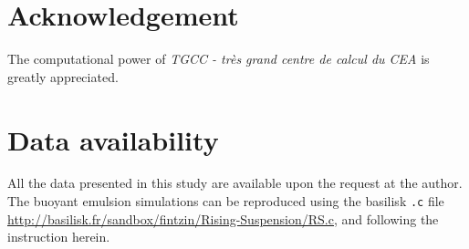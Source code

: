 \section*{Acknowledgement}

The computational power of  \textit{TGCC - tr\`es grand centre de calcul du CEA} is greatly appreciated. 
\section*{Data availability}

All the data presented in this study are available upon the request at the author. 
The buoyant emulsion simulations can be reproduced using the basilisk \texttt{.c} file \url{http://basilisk.fr/sandbox/fintzin/Rising-Suspension/RS.c}, and following the instruction herein. 